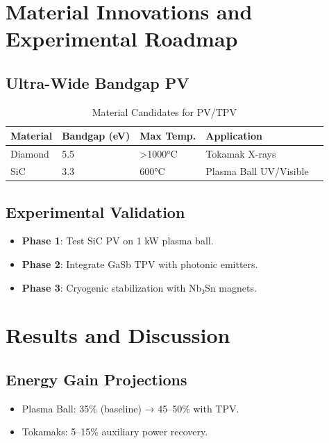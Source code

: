 \documentclass{article}
\begin{document}
\section{Material Innovations and Experimental Roadmap}
\label{sec:materials}

\subsection{Ultra-Wide Bandgap PV}
\begin{table}[ht]
    \centering
    \caption{Material Candidates for PV/TPV}
    \label{tab:materials}
    \begin{tabular}{lllll}
        \toprule
        \textbf{Material} & \textbf{Bandgap (eV)} & \textbf{Max Temp.} & \textbf{Application} \\
        \midrule
        Diamond & 5.5 & >1000°C & Tokamak X-rays \\
        SiC & 3.3 & 600°C & Plasma Ball UV/Visible \\
        \bottomrule
    \end{tabular}
\end{table}

\subsection{Experimental Validation}
\begin{itemize}
    \item \textbf{Phase 1}: Test SiC PV on 1 kW plasma ball.
    \item \textbf{Phase 2}: Integrate GaSb TPV with photonic emitters.
    \item \textbf{Phase 3}: Cryogenic stabilization with Nb₃Sn magnets.
\end{itemize}

\section{Results and Discussion}
\label{sec:results}

\subsection{Energy Gain Projections}
\begin{itemize}
    \item Plasma Ball: 35\% (baseline) → 45–50\% with TPV.
    \item Tokamaks: 5–15\% auxiliary power recovery.
\end{itemize}
\end{document}
